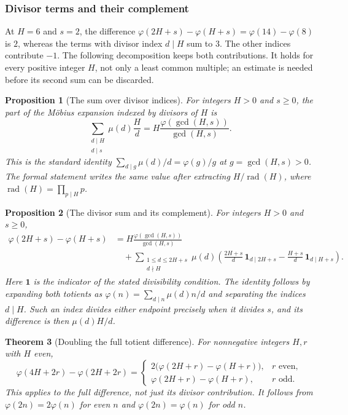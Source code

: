 \documentclass[11pt]{article}
\theoremstyle{plain}
\newtheorem{thm}{Theorem}[section]
\newtheorem{prop}[thm]{Proposition}
\theoremstyle{definition}
\theoremstyle{remark}
\begin{document}
\subsubsection{Divisor terms and their complement}

At $H=6$ and $s=2$, the difference
$\varphi(2H+s)-\varphi(H+s)=\varphi(14)-\varphi(8)$ is $2$, whereas
the terms with divisor index $d\mid H$ sum to $3$. The other indices
contribute $-1$. The following decomposition keeps both contributions.
It holds for every positive integer $H$, not only a least common multiple;
an estimate is needed before its second sum can be discarded.


\begin{prop}[The sum over divisor indices]\label{prop:sum-over-divisor-indices}
For integers $H>0$ and $s\ge0$, the part of the M\"obius expansion
indexed by divisors of $H$ is
\[
 \sum_{\substack{d\mid H\\d\mid s}}\mu(d)\frac Hd
       =H\frac{\varphi(\gcd(H,s))}{\gcd(H,s)}.
\]
This is the standard identity
$\sum_{d\mid g}\mu(d)/d=\varphi(g)/g$ at $g=\gcd(H,s)>0$.
The formal statement writes the same value after extracting
$H/\operatorname{rad}(H)$, where
$\operatorname{rad}(H)=\prod_{p\mid H}p$.
\end{prop}

\begin{prop}[The divisor sum and its complement]\label{prop:divisor-sum-complement}
For integers $H>0$ and $s\ge0$,
\[
\begin{aligned}
 \varphi(2H+s)-\varphi(H+s)
 &=H\frac{\varphi(\gcd(H,s))}{\gcd(H,s)}\\
 &\quad+\sum_{\substack{1\le d\le2H+s\\d\nmid H}}
 \mu(d)\left(\frac{2H+s}{d}\,\mathbf1_{d\mid2H+s}
           -\frac{H+s}{d}\,\mathbf1_{d\mid H+s}\right).
\end{aligned}
\]
Here $\mathbf1$ is the indicator of the stated divisibility condition.
The identity follows by expanding both totients as
$\varphi(n)=\sum_{d\mid n}\mu(d)n/d$ and separating the indices
$d\mid H$. Such an index divides either endpoint precisely when it
divides $s$, and its difference is then $\mu(d)H/d$.
\end{prop}

\begin{thm}[Doubling the full totient difference]\label{thm:doubling-full-totient-difference}
For nonnegative integers $H,r$ with $H$ even,
\[
 \varphi(4H+2r)-\varphi(2H+2r)=
 \begin{cases}
 2\bigl(\varphi(2H+r)-\varphi(H+r)\bigr),&r\text{ even},\\
 \varphi(2H+r)-\varphi(H+r),&r\text{ odd}.
 \end{cases}
\]
This applies to the full difference, not just its divisor contribution.
It follows from $\varphi(2n)=2\varphi(n)$ for even $n$ and
$\varphi(2n)=\varphi(n)$ for odd $n$.
\end{thm}
\end{document}
